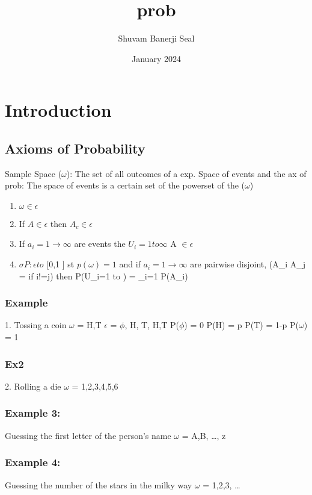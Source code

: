 \documentclass{article}
\title{prob}
\author{Shuvam Banerji Seal}
\date{January 2024}
\begin{document}
\maketitle

\section{Introduction}
\subsection{Axioms of Probability}
Sample Space ($\omega$): The set of all outcomes of a exp.
Space of events and the ax of prob:
The space of events is a certain set of the powerset of the ($\omega$)

\begin{enumerate}
    \item $\omega \in \epsilon$
    \item If $A \in \epsilon $ then $A_c \in \epsilon$
    \item If $a_i=1 \to \infty$ are events the $U_i=1 to \infty$ A $\in \epsilon$
    \item $\sigma P : \epsilon to$ [0,1 ] st $p(\omega)=1$
    and if $a_i=1 \to \infty$ are pairwise disjoint, (A_i \inU A_j = \phi if i!=j) then
    P(U_i=1 to \infty) = \sum _i=1 \infty P(A_i)

\end{enumerate}

\subsubsection{Example}
1. Tossing a coin $\omega$ = {H,T}
$\epsilon$ = {$\phi$, {H}, {T}, {H,T}}
P($\phi$) = 0
P(H) = p
P(T) = 1-p
P($\omega$) = 1

\subsubsection{Ex2}
2. Rolling a die
$\omega$ = {1,2,3,4,5,6}

\subsubsection{Example 3:}
Guessing the first letter of the person's name 
$\omega$ = {A,B, \dots, z}

\subsubsection{Example 4:}
Guessing the number of the stars in the milky way
$\omega$ = {1,2,3, \dots }
\end{document}

